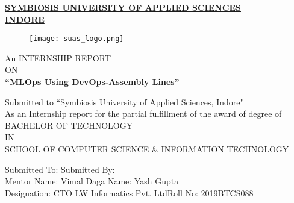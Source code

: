 \documentclass[12pt,oneside,a4paper]{report}
\begin{document}

\begin{large}
\begin{center}
\fontsize{18pt}{10pt}\selectfont
\underline{\textbf{SYMBIOSIS UNIVERSITY OF APPLIED SCIENCES}}\\
\vspace{5.0mm}\underline{\textbf{INDORE}}
\end{center}
\end{large}
\vspace{5.0mm}

\begin{figure}[h]
\centering
\texttt{[image: suas\_logo.png]}
\end{figure}

\begin{center}
\fontsize{14pt}{10pt}\selectfont
\vspace{0.3in} An INTERNSHIP REPORT\\ \vspace{5.0mm}ON\\ 
\vspace{5.0mm}\textbf{“MLOps Using DevOps-Assembly Lines”}


\fontsize{14pt}{10pt}\selectfont
\vspace{0.4in} Submitted to “Symbiosis University of Applied Sciences, Indore"\\
\fontsize{14pt}{10pt}\selectfont
As an Internship report for the partial fulfillment of the award of degree of\\
\vspace{0.5in}
BACHELOR OF TECHNOLOGY\\ \vspace{5.0mm}IN\\ \vspace{5.0mm} SCHOOL OF COMPUTER SCIENCE \& INFORMATION TECHNOLOGY
\end{center}
\begin{flushleft}
\vspace{15.0mm}\hspace{10mm}Submitted To:
\hspace{3.0in} Submitted By:\\ \hspace{10mm}Mentor Name: Vimal Daga \hspace{2.1in} Name: Yash Gupta\\ \hspace{10mm}Designation: CTO LW Informatics Pvt. Ltd\hspace{0.99in}Roll No: 2019BTCS088
\end{flushleft}
\end{document}

